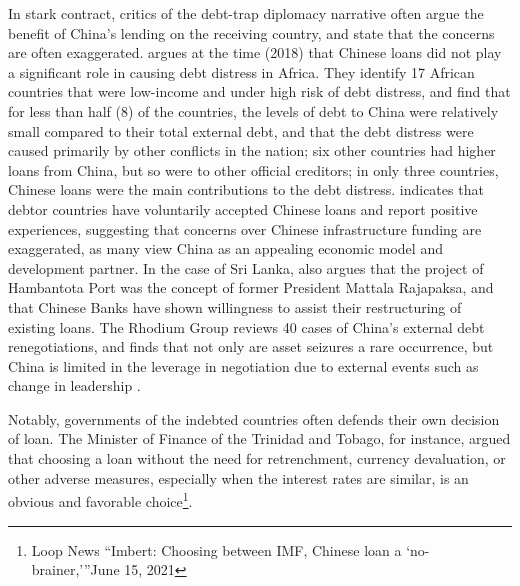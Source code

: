 In stark contract, critics of the debt-trap diplomacy narrative often argue the benefit of China's lending on the receiving country, and state that the concerns are often exaggerated.
\citet*{Eom-18} argues at the time (2018) that Chinese loans did not play a significant role in causing debt distress in Africa. They identify 17 African countries that were low-income and under high risk of debt distress, and find that for less than half (8) of the countries, the levels of debt to China were relatively small compared to their total external debt, and that the debt distress were caused primarily by other conflicts in the nation; six other countries had higher loans from China, but so were to other official creditors; in only three countries, Chinese loans were the main contributions to the debt distress.
\citet*{Brautigam-meme-2020} indicates that debtor countries have voluntarily accepted Chinese loans and report positive experiences, suggesting that concerns over Chinese infrastructure funding are exaggerated, as many view China as an appealing economic model and development partner.
In the case of Sri Lanka, \citet*{Brautigam-meme-2020} also argues that the project of Hambantota Port was the concept of former President Mattala Rajapaksa, and that Chinese Banks have shown willingness to assist their restructuring of existing loans.
The Rhodium Group reviews 40 cases of China's external debt renegotiations, and finds that not only are asset seizures a rare occurrence, but China is limited in the leverage in negotiation due to external events such as change in leadership \citep*{Rhodium-DTD-19}.

Notably, governments of the indebted countries often defends their own decision of loan. The Minister of Finance of the Trinidad and Tobago, for instance, argued that choosing a loan without the need for retrenchment, currency devaluation, or other adverse measures, especially when the interest rates are similar, is an obvious and favorable choice\footnote{Loop News ``Imbert: Choosing between IMF, Chinese loan a `no-brainer,'''June 15, 2021}.

